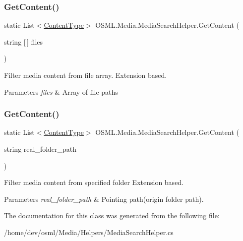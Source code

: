 \subsubsection{\texorpdfstring{GetContent()}{GetContent()}\hspace{0.1cm}{\footnotesize\ttfamily [1/2]}}
{\footnotesize\ttfamily static List$<$\mbox{\hyperlink{classOSML_1_1Media_1_1ContentType}{Content\+Type}}$>$ O\+S\+M\+L.\+Media.\+Media\+Search\+Helper.\+Get\+Content (\begin{DoxyParamCaption}\item[{string \mbox{[}$\,$\mbox{]}}]{files }\end{DoxyParamCaption})\hspace{0.3cm}{\ttfamily [static]}}



Filter media content from file array. Extension based. 


\begin{DoxyParams}{Parameters}
{\em files} & Array of file paths\\
\hline
\end{DoxyParams}
\mbox{\label{classOSML_1_1Media_1_1MediaSearchHelper_a066a32f98635b3f7d6672856923e1599}} 
\subsubsection{\texorpdfstring{GetContent()}{GetContent()}\hspace{0.1cm}{\footnotesize\ttfamily [2/2]}}
{\footnotesize\ttfamily static List$<$\mbox{\hyperlink{classOSML_1_1Media_1_1ContentType}{Content\+Type}}$>$ O\+S\+M\+L.\+Media.\+Media\+Search\+Helper.\+Get\+Content (\begin{DoxyParamCaption}\item[{string}]{real\+\_\+folder\+\_\+path }\end{DoxyParamCaption})\hspace{0.3cm}{\ttfamily [static]}}



Filter media content from specified folder Extension based. 


\begin{DoxyParams}{Parameters}
{\em real\+\_\+folder\+\_\+path} & Pointing path(origin folder path).\\
\hline
\end{DoxyParams}


The documentation for this class was generated from the following file\+:\begin{DoxyCompactItemize}
\item 
/home/dev/osml/\+Media/\+Helpers/Media\+Search\+Helper.\+cs\end{DoxyCompactItemize}

